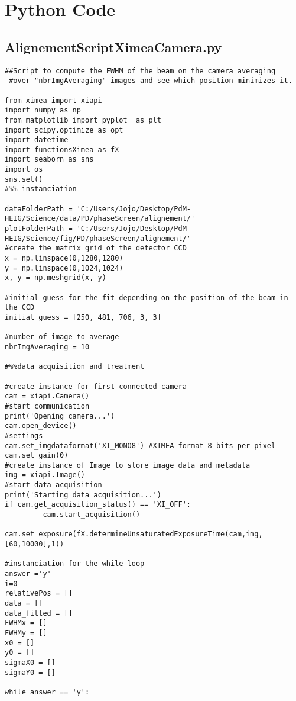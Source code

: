

\chapter{Python Code}

\label{AppPythonCode}

\section{AlignementScriptXimeaCamera.py}
\label{app:AlignementScriptXimeaCamera}

\begin{lstlisting}
##Script to compute the FWHM of the beam on the camera averaging
 #over "nbrImgAveraging" images and see which position minimizes it.

from ximea import xiapi
import numpy as np
from matplotlib import pyplot  as plt
import scipy.optimize as opt
import datetime
import functionsXimea as fX
import seaborn as sns
import os
sns.set()
#%% instanciation

dataFolderPath = 'C:/Users/Jojo/Desktop/PdM-HEIG/Science/data/PD/phaseScreen/alignement/'
plotFolderPath = 'C:/Users/Jojo/Desktop/PdM-HEIG/Science/fig/PD/phaseScreen/alignement/'
#create the matrix grid of the detector CCD
x = np.linspace(0,1280,1280)
y = np.linspace(0,1024,1024)
x, y = np.meshgrid(x, y)
 
#initial guess for the fit depending on the position of the beam in the CCD
initial_guess = [250, 481, 706, 3, 3]

#number of image to average
nbrImgAveraging = 10

#%%data acquisition and treatment

#create instance for first connected camera
cam = xiapi.Camera()
#start communication
print('Opening camera...')
cam.open_device()
#settings
cam.set_imgdataformat('XI_MONO8') #XIMEA format 8 bits per pixel
cam.set_gain(0)
#create instance of Image to store image data and metadata
img = xiapi.Image()
#start data acquisition
print('Starting data acquisition...')
if cam.get_acquisition_status() == 'XI_OFF':
         cam.start_acquisition()

cam.set_exposure(fX.determineUnsaturatedExposureTime(cam,img,[60,10000],1))

#instanciation for the while loop
answer ='y'
i=0
relativePos = []
data = []
data_fitted = []
FWHMx = []
FWHMy = []
x0 = []
y0 = []
sigmaX0 = []
sigmaY0 = []

while answer == 'y':


\end{lstlisting}
